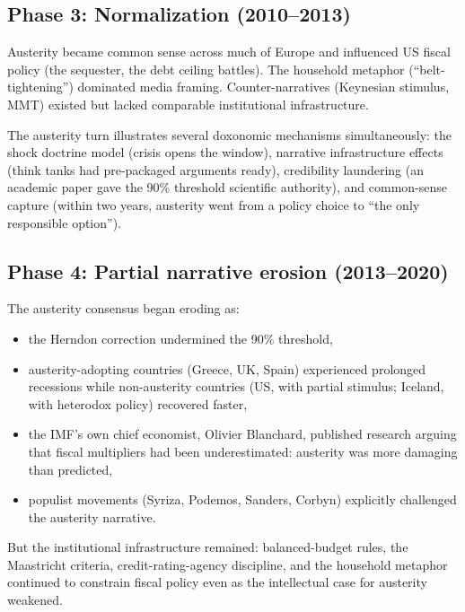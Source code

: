 \subsection{Phase 3: Normalization (2010--2013)}

Austerity became common sense across much of Europe and influenced US fiscal policy (the sequester, the debt ceiling battles).
The household metaphor (``belt-tightening'') dominated media framing.
Counter-narratives (Keynesian stimulus, MMT) existed but lacked comparable institutional infrastructure.

\begin{remark}
The austerity turn illustrates several doxonomic mechanisms simultaneously:
the shock doctrine model (crisis opens the window),
narrative infrastructure effects (think tanks had pre-packaged arguments ready),
credibility laundering (an academic paper gave the 90\% threshold scientific authority),
and common-sense capture (within two years, austerity went from a policy choice to ``the only responsible option'').
\end{remark}

\subsection{Phase 4: Partial narrative erosion (2013--2020)}

The austerity consensus began eroding as:
\begin{itemize}[nosep]
  \item the Herndon correction undermined the 90\% threshold,
  \item austerity-adopting countries (Greece, UK, Spain) experienced prolonged recessions while non-austerity countries (US, with partial stimulus; Iceland, with heterodox policy) recovered faster,
  \item the IMF's own chief economist, Olivier Blanchard, published research arguing that fiscal multipliers had been underestimated: austerity was more damaging than predicted,
  \item populist movements (Syriza, Podemos, Sanders, Corbyn) explicitly challenged the austerity narrative.
\end{itemize}

But the institutional infrastructure remained: balanced-budget rules, the Maastricht criteria, credit-rating-agency discipline, and the household metaphor continued to constrain fiscal policy even as the intellectual case for austerity weakened.

